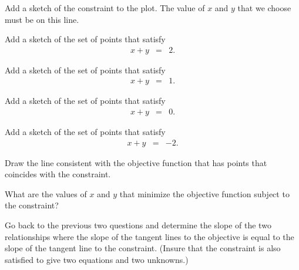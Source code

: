 \begin{problem}
  \vspace{-1em}
  \scalebox{0.55}{}

  \begin{subproblem}
    \item Add a sketch of the constraint to the plot. The value of $x$
      and $y$ that we choose must be on this line.
    \item Add a sketch of the set of points that satisfy
      \begin{eqnarray*}
        x + y & = & 2.
      \end{eqnarray*}
    \item Add a sketch of the set of points that satisfy
      \begin{eqnarray*}
        x + y & = & 1.
      \end{eqnarray*}
    \item Add a sketch of the set of points that satisfy
      \begin{eqnarray*}
        x + y & = & 0.
      \end{eqnarray*}
    \item Add a sketch of the set of points that satisfy
      \begin{eqnarray*}
        x + y & = & -2.
      \end{eqnarray*}
    \item Draw the line consistent with the objective function that
      has points that coincides with the constraint.
    \item What are the values of $x$ and $y$ that minimize the
      objective function subject to the constraint?
  \end{subproblem}

  \clearpage

\item Go back to the previous two questions and determine the slope of
  the two relationships where the slope of the tangent lines to the
  objective is equal to the slope of the tangent line to the
  constraint. (Insure that the constraint is also satisfied to give
  two equations and two unknowns.)

  \hfill

  \clearpage


\end{problem}
